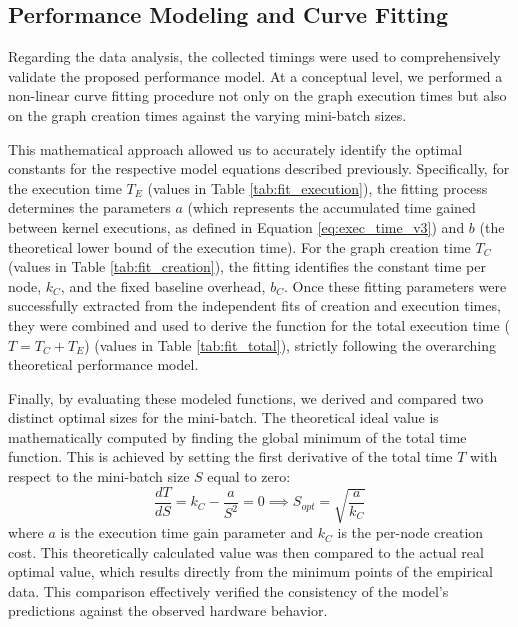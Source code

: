 \documentclass[10pt,twocolumn]{article}
\begin{document}
\subsection{Performance Modeling and Curve Fitting}
Regarding the data analysis, the collected timings were used to comprehensively validate the proposed performance model. At a conceptual level, we performed a non-linear curve fitting procedure not only on the graph execution times but also on the graph creation times against the varying mini-batch sizes. 

This mathematical approach allowed us to accurately identify the optimal constants for the respective model equations described previously. Specifically, for the execution time $T_E$ (values in Table \ref{tab:fit_execution}), the fitting process determines the parameters $a$ (which represents the accumulated time gained between kernel executions, as defined in Equation \ref{eq:exec_time_v3}) and $b$ (the theoretical lower bound of the execution time). For the graph creation time $T_C$ (values in Table \ref{tab:fit_creation}), the fitting identifies the constant time per node, $k_C$, and the fixed baseline overhead, $b_C$. 
Once these fitting parameters were successfully extracted from the independent fits of creation and execution times, they were combined and used to derive the function for the total execution time ($T = T_C + T_E$) (values in Table \ref{tab:fit_total}), strictly following the overarching theoretical performance model.

Finally, by evaluating these modeled functions, we derived and compared two distinct optimal sizes for the mini-batch. The theoretical ideal value is mathematically computed by finding the global minimum of the total time function. This is achieved by setting the first derivative of the total time $T$ with respect to the mini-batch size $S$ equal to zero:
\[ \frac{dT}{dS} = k_C - \frac{a}{S^2} = 0 \implies S_{opt} = \sqrt{\frac{a}{k_C}} \]
where $a$ is the execution time gain parameter and $k_C$ is the per-node creation cost. This theoretically calculated value was then compared to the actual real optimal value, which results directly from the minimum points of the empirical data. This comparison effectively verified the consistency of the model's predictions against the observed hardware behavior.
\end{document}
